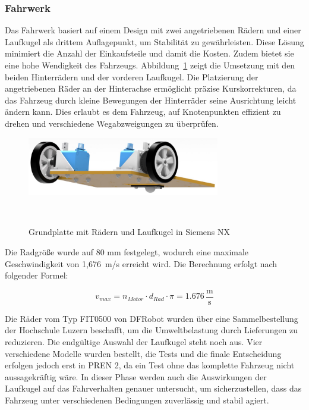 \documentclass[main.tex]{subfiles} %
\begin{document}
\newpage

\subsubsection*{Fahrwerk}

Das Fahrwerk basiert auf einem Design mit zwei angetriebenen Rädern und einer 
Laufkugel als drittem Auflagepunkt, um Stabilität zu gewährleisten. Diese Lösung 
minimiert die Anzahl der Einkaufsteile und damit die Kosten. Zudem bietet sie eine 
hohe Wendigkeit des Fahrzeugs. 
Abbildung~\ref{fig:Fahrwerk} zeigt die Umsetzung mit den beiden Hinterrädern 
und der vorderen Laufkugel. Die Platzierung der angetriebenen Räder an der Hinterachse 
ermöglicht präzise Kurskorrekturen, da das Fahrzeug durch kleine Bewegungen der 
Hinterräder seine Ausrichtung leicht ändern kann. Dies erlaubt es dem Fahrzeug, auf 
Knotenpunkten effizient zu drehen und verschiedene Wegabzweigungen zu überprüfen.

\begin{figure}[H]
    \centering
    \includegraphics[width=0.75\textwidth]{Fahrwerk.pdf}
    \caption{Grundplatte mit Rädern und Laufkugel in Siemens NX}~\label{fig:Fahrwerk}
\end{figure}

Die Radgröße wurde auf 80 mm festgelegt, wodurch eine maximale Geschwindigkeit von 
1,676~m/s erreicht wird. Die Berechnung erfolgt nach folgender Formel:

\[ v_{max} = n_{Motor} \cdot d_{Rad} \cdot \pi = 1.676 \, \frac{\text{m}}{\text{s}} \]

Die Räder vom Typ FIT0500 von DFRobot wurden über eine Sammelbestellung der Hochschule 
Luzern beschafft, um die Umweltbelastung durch Lieferungen zu reduzieren. Die endgültige 
Auswahl der Laufkugel steht noch aus. Vier verschiedene Modelle wurden bestellt, die 
Tests und die finale Entscheidung erfolgen jedoch erst in PREN 2, da ein Test ohne das 
komplette Fahrzeug nicht aussagekräftig wäre. In dieser Phase werden auch die Auswirkungen 
der Laufkugel auf das Fahrverhalten genauer untersucht, um sicherzustellen, dass das 
Fahrzeug unter verschiedenen Bedingungen zuverlässig und stabil agiert.
\end{document}
